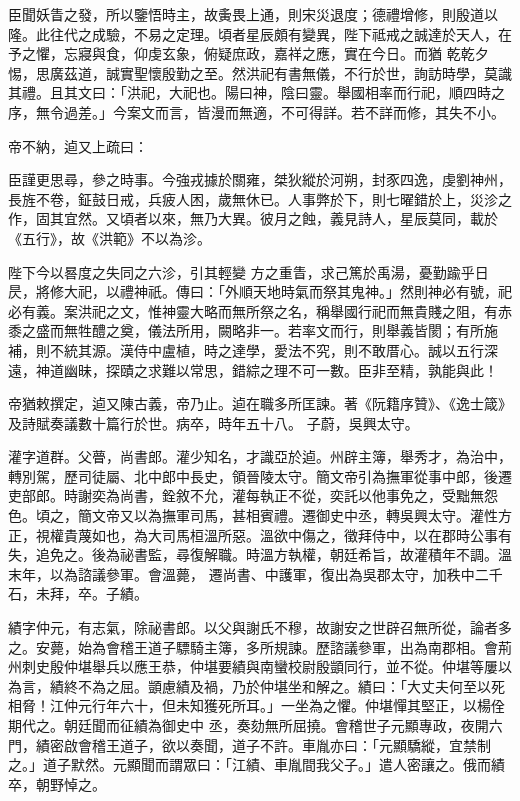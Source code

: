 \begin{pinyinscope}
 臣聞妖眚之發，所以鑒悟時主，故夤畏上通，則宋災退度；德禮增修，則殷道以隆。此往代之成驗，不易之定理。頃者星辰頗有變異，陛下祗戒之誠達於天人，在予之懼，忘寢與食，仰虔玄象，俯疑庶政，嘉祥之應，實在今日。而猶
 乾乾夕惕，思廣茲道，誠實聖懷殷勤之至。然洪祀有書無儀，不行於世，詢訪時學，莫識其禮。且其文曰：「洪祀，大祀也。陽曰神，陰曰靈。舉國相率而行祀，順四時之序，無令過差。」今案文而言，皆漫而無適，不可得詳。若不詳而修，其失不小。



 帝不納，逌又上疏曰：



 臣謹更思尋，參之時事。今強戎據於關雍，桀狄縱於河朔，封豕四逸，虔劉神州，長旌不卷，鉦鼓日戒，兵疲人困，歲無休已。人事弊於下，則七曜錯於上，災沴之作，固其宜然。又頃者以來，無乃大異。彼月之蝕，義見詩人，星辰莫同，載於《五行》，故《洪範》不以為沴。



 陛下今以晷度之失同之六沴，引其輕變
 方之重眚，求己篤於禹湯，憂勤踰乎日昃，將修大祀，以禮神祇。傳曰：「外順天地時氣而祭其鬼神。」然則神必有號，祀必有義。案洪祀之文，惟神靈大略而無所祭之名，稱舉國行祀而無貴賤之阻，有赤黍之盛而無牲醴之奠，儀法所用，闕略非一。若率文而行，則舉義皆閡；有所施補，則不統其源。漢侍中盧植，時之達學，愛法不究，則不敢厝心。誠以五行深遠，神道幽昧，探賾之求難以常思，錯綜之理不可一數。臣非至精，孰能與此！



 帝猶敕撰定，逌又陳古義，帝乃止。逌在職多所匡諫。著《阮籍序贊》、《逸士箴》及詩賦奏議數十篇行於世。病卒，時年五十八。
 子蔚，吳興太守。



 灌字道群。父瞢，尚書郎。灌少知名，才識亞於逌。州辟主簿，舉秀才，為治中，轉別駕，歷司徒屬、北中郎中長史，領晉陵太守。簡文帝引為撫軍從事中郎，後遷吏部郎。時謝奕為尚書，銓敘不允，灌每執正不從，奕託以他事免之，受黜無怨色。頃之，簡文帝又以為撫軍司馬，甚相賓禮。遷御史中丞，轉吳興太守。灌性方正，視權貴蔑如也，為大司馬桓溫所惡。溫欲中傷之，徵拜侍中，以在郡時公事有失，追免之。後為祕書監，尋復解職。時溫方執權，朝廷希旨，故灌積年不調。溫末年，以為諮議參軍。會溫薨，
 遷尚書、中護軍，復出為吳郡太守，加秩中二千石，未拜，卒。子績。



 績字仲元，有志氣，除祕書郎。以父與謝氏不穆，故謝安之世辟召無所從，論者多之。安薨，始為會稽王道子驃騎主簿，多所規諫。歷諮議參軍，出為南郡相。會荊州刺史殷仲堪舉兵以應王恭，仲堪要績與南蠻校尉殷顗同行，並不從。仲堪等屢以為言，績終不為之屈。顗慮績及禍，乃於仲堪坐和解之。績曰：「大丈夫何至以死相脅！江仲元行年六十，但未知獲死所耳。」一坐為之懼。仲堪憚其堅正，以楊佺期代之。朝廷聞而征績為御史中
 丞，奏劾無所屈撓。會稽世子元顯專政，夜開六門，績密啟會稽王道子，欲以奏聞，道子不許。車胤亦曰：「元顯驕縱，宜禁制之。」道子默然。元顯聞而謂眾曰：「江績、車胤間我父子。」遣人密讓之。俄而績卒，朝野悼之。




\end{pinyinscope}
